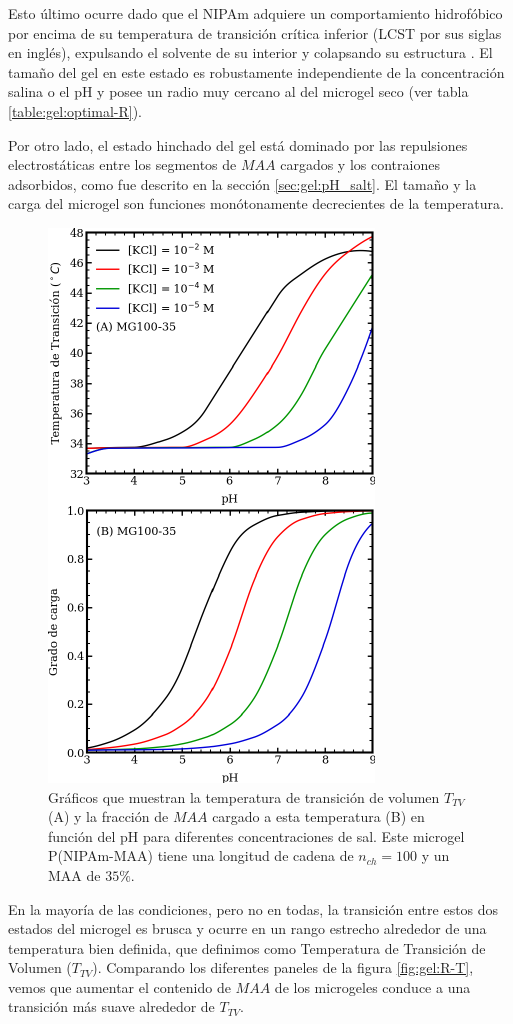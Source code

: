 Esto \'ultimo ocurre dado que el NIPAm adquiere un comportamiento hidrof\'obico por encima de su temperatura de transici\'on cr\'itica inferior (LCST por sus siglas en ingl\'es), expulsando el solvente de su interior y colapsando su estructura \cite{sbeih2019structural}.
El tama\~no del gel en este estado es robustamente independiente de la concentraci\'on salina o el pH y posee un radio muy cercano al del microgel seco (ver tabla \ref{table:gel:optimal-R}).

Por otro lado, el estado hinchado del gel est\'a dominado por las repulsiones electrost\'aticas entre los segmentos de $MAA$ cargados y los contraiones adsorbidos, como fue descrito en la secci\'on \ref{sec:gel:pH_salt}.
El tama\~no y la carga del microgel son funciones mon\'otonamente decrecientes de la temperatura.


\begin{figure}[!htb]
	\centering
	\includegraphics[width=0.40\linewidth]{Figures/graph-gel/Tpt-pH.pdf}
	\caption{Gr\'aficos que muestran la temperatura de transici\'on de volumen $T_{TV}$ (A) y la fracci\'on de $MAA$ cargado a esta temperatura (B) en funci\'on del pH para diferentes concentraciones de sal.
		Este microgel P(NIPAm-MAA) tiene una longitud de cadena de $n_{ch}=100$ y un MAA de $35\%$.}
	\label{fig:gel:Tpt-pH}
\end{figure}


En la mayor\'ia de las condiciones, pero no en todas, la transici\'on entre estos dos estados del microgel es brusca y ocurre en un rango estrecho alrededor de una temperatura bien definida, que definimos como Temperatura de Transici\'on de Volumen ($T_{TV}$). Comparando los diferentes paneles de la figura \ref{fig:gel:R-T}, vemos que aumentar el contenido de $MAA$ de los microgeles conduce a una transici\'on m\'as suave alrededor de $T_{TV}$.

